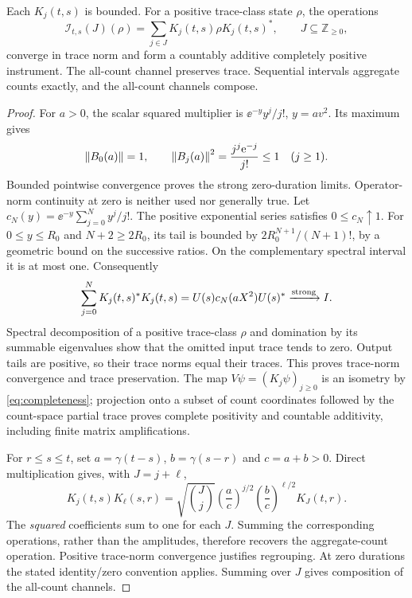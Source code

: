 \begin{theorem}\label{thm:instrument}
Each $K_j(t,s)$ is bounded. For a positive trace-class state $\rho$, the
operations
\[
 \mathcal I_{t,s}(J)(\rho)=\sum_{j\in J}K_j(t,s)\rho K_j(t,s)^*,
 \qquad J\subseteq\mathbb Z_{\ge0},
\]
converge in trace norm and form a countably additive completely positive
instrument. The all-count channel preserves trace. Sequential intervals
aggregate counts exactly, and the all-count channels compose.
\end{theorem}
\begin{proof}
For $a>0$, the scalar squared multiplier is $\ee^{-y}y^j/j!$, $y=av^2$.
Its maximum gives
\begin{equation}\label{eq:Knorm}
 \left\lVert B_0(a)\right\rVert=1,\qquad
 \left\lVert B_j(a)\right\rVert^2=\frac{j^j\mathrm e^{-j}}{j!}\le1\quad(j\ge1).
\end{equation}
Bounded pointwise convergence proves the strong zero-duration limits.
Operator-norm continuity at zero is neither used nor generally true.
Let $c_N(y)=\ee^{-y}\sum_{j=0}^Ny^j/j!$. The positive exponential series
satisfies $0\le c_N\uparrow1$. For $0\le y\le R_0$ and $N+2\ge2R_0$,
its tail is bounded by $2R_0^{N+1}/(N+1)!$, by a geometric bound on the
successive ratios. On the complementary spectral interval it is at most
one. Consequently
\begin{equation}\label{eq:completeness}
 \sum_{j=0}^NK_j(t,s)^*K_j(t,s)
 =U(s)c_N(aX^2)U(s)^*\xrightarrow{\rm strong}I.
\end{equation}
Spectral decomposition of a positive trace-class $\rho$ and domination by
its summable eigenvalues show that the omitted input trace tends to zero.
Output tails are positive, so their trace norms equal their traces.
This proves trace-norm convergence and trace preservation. The map
$V\psi=(K_j\psi)_{j\ge0}$ is an isometry by \eqref{eq:completeness};
projection onto a subset of count coordinates followed by the count-space
partial trace proves complete positivity and countable additivity, including
finite matrix amplifications.

For $r\le s\le t$, set $a=\gamma(t-s)$, $b=\gamma(s-r)$ and $c=a+b>0$.
Direct multiplication gives, with $J=j+\ell$,
\begin{equation}\label{eq:composition}
 K_j(t,s)K_\ell(s,r)
 =\sqrt{\binom Jj}\left(\frac ac\right)^{j/2}
                     \left(\frac bc\right)^{\ell/2}K_J(t,r).
\end{equation}
The \emph{squared} coefficients sum to one for each $J$. Summing the
corresponding operations, rather than the amplitudes, therefore recovers
the aggregate-count operation. Positive trace-norm convergence justifies
regrouping. At zero durations the stated identity/zero convention applies.
Summing over $J$ gives composition of the all-count channels.
\end{proof}

